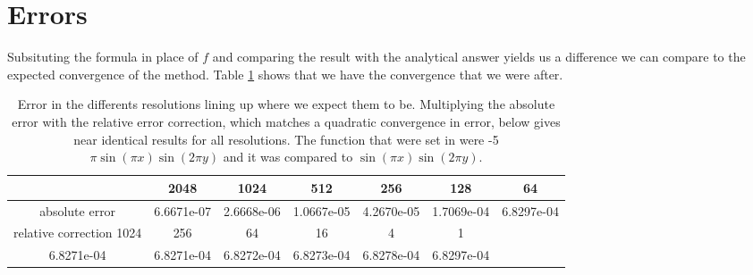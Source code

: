 \section{Errors}
Subsituting the formula in place of $f$ and comparing the result with the analytical answer yields us a difference we can compare to the expected convergence of the method. Table \ref{tab:relerr} shows that we have the convergence that we were after. 

\begin{table}[t]
\caption{\label{tab:relerr}Error in the differents resolutions lining up where we expect them to be. Multiplying the absolute error with the relative error correction, which matches a quadratic convergence in error, below gives near identical results for all resolutions. The function that were set in were -5 $\pi \sin(\pi x ) \sin(2\pi y)$ and it was compared to $\sin(\pi x ) \sin(2\pi y)$. }
\begin{tabular}{|c|c|c|c|c|c|c|}
\hline 
 &  2048 & 1024 & 512 & 256 & 128 & 64 \\ 
\hline 
absolute error &6.6671e-07  & 2.6668e-06 &  1.0667e-05  & 4.2670e-05 &  1.7069e-04 &  6.8297e-04\\
\hline 
relative correction   1024 &   256   &  64   &  16  &    4   &   1\\
\hline 
 6.8271e-04 &  6.8271e-04 &  6.8272e-04 &  6.8273e-04 &  6.8278e-04  & 6.8297e-04\\
\hline 
\end{tabular}
\end{table} 